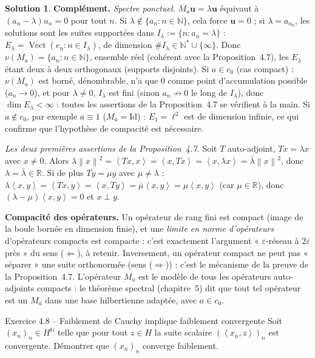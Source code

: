 \documentclass[11pt,a4paper]{article}
\newcommand{\R}{\mathbb{R}}
\newcommand{\N}{\mathbb{N}}
\newcommand{\adh}[1]{\overline{#1}}
\newcommand{\Vect}{\operatorname{Vect}}
\newcommand{\norm}[1]{\left\|#1\right\|}
\newcommand{\ps}[2]{\left\langle #1,#2\right\rangle}
\theoremstyle{definition}
\newtheorem*{solution}{Solution}
\begin{document}
\begin{solution}
\medskip
\noindent\textbf{Complément.} \emph{Spectre ponctuel.} $M_a\mathbf u=\lambda\mathbf u$ équivaut à $(a_n-\lambda)u_n=0$ pour tout $n$. Si $\lambda\notin\{a_n:n\in\N\}$, cela force $\mathbf u=0$ ; si $\lambda=a_{n_0}$, les solutions sont les suites supportées dans $I_\lambda:=\{n:a_n=\lambda\}$ : $E_\lambda=\adh{\Vect}(e_n:n\in I_\lambda)$, de dimension $\#I_\lambda\in\N^*\cup\{\infty\}$. Donc $\nu(M_a)=\{a_n:n\in\N\}$, ensemble réel (cohérent avec la Proposition~4.7), les $E_\lambda$ étant deux à deux orthogonaux (supports disjoints). Si $a\in c_0$ (cas compact) : $\nu(M_a)$ est borné, dénombrable, n'a que $0$ comme point d'accumulation possible ($a_n\to0$), et pour $\lambda\ne0$, $I_\lambda$ est fini (sinon $a_n\not\to0$ le long de $I_\lambda$), donc $\dim E_\lambda<\infty$ : toutes les assertions de la Proposition~4.7 se vérifient à la main. Si $a\notin c_0$, par exemple $a\equiv1$ ($M_a=\mathrm{Id}$) : $E_1=\ell^2$ est de dimension infinie, ce qui confirme que l'hypothèse de compacité est nécessaire.

\emph{Les deux premières assertions de la Proposition~4.7.} Soit $T$ auto-adjoint, $Tx=\lambda x$ avec $x\ne0$. Alors $\lambda\norm x^2=\ps{Tx}x=\ps x{Tx}=\ps x{\lambda x}=\bar\lambda\norm x^2$, donc $\lambda=\bar\lambda\in\R$. Si de plus $Ty=\mu y$ avec $\mu\ne\lambda$ : $\lambda\ps xy=\ps{Tx}y=\ps x{Ty}=\bar\mu\ps xy=\mu\ps xy$ (car $\mu\in\R$), donc $(\lambda-\mu)\ps xy=0$ et $x\perp y$.
\end{solution}

\begin{pointcle}
\textbf{Compacité des opérateurs.} Un opérateur de rang fini est compact (image de la boule bornée en dimension finie), et une \emph{limite en norme d'opérateurs} d'opérateurs compacts est compacte : c'est exactement l'argument « $\varepsilon$-réseau à $2\varepsilon$ près » du sens ($\Leftarrow$), à retenir. Inversement, un opérateur compact ne peut pas « séparer » une suite orthonormée (sens ($\Rightarrow$)) : c'est le mécanisme de la preuve de la Proposition~4.7. L'opérateur $M_a$ est le modèle de tous les opérateurs auto-adjoints compacts : le théorème spectral (chapitre~5) dit que tout tel opérateur est un $M_a$ dans une base hilbertienne adaptée, avec $a\in c_0$.
\end{pointcle}

\begin{exo}{Exercice 4.8 -- Faiblement de Cauchy implique faiblement convergente}
Soit $(x_n)_n\in H^\N$ telle que pour tout $z\in H$ la suite scalaire $(\ps{x_n}z)_n$ est convergente. Démontrer que $(x_n)_n$ converge faiblement.
\end{exo}
\end{document}
